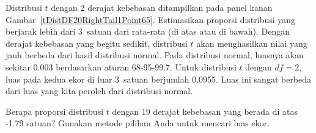 \begin{examplewrap}
\begin{nexample}{Distribusi $t$ dengan 2 derajat kebebasan
    ditampilkan pada panel kanan
    Gambar~\ref{tDistDF20RightTail1Point65}.
    Estimasikan proporsi distribusi yang berjarak lebih
    dari 3~satuan dari rata-rata (di atas atau di bawah).}
  Dengan derajat kebebasan yang begitu sedikit, distribusi $t$
  akan menghasilkan nilai yang jauh berbeda dari hasil distribusi
  normal.
  Pada distribusi normal, luasnya akan sekitar
  0.003 berdasarkan aturan 68-95-99.7.
  Untuk distribusi $t$ dengan $df = 2$, luas pada kedua
  ekor di luar 3~satuan berjumlah 0.0955.
  Luas ini sangat berbeda dari luas yang
  kita peroleh dari distribusi normal.
\end{nexample}
\end{examplewrap}

\begin{exercisewrap}
\begin{nexercise}
Berapa proporsi distribusi $t$ dengan 19 derajat
kebebasan yang berada di atas -1.79 satuan?
Gunakan metode pilihan Anda untuk mencari luas ekor.\footnotemark{}
\end{nexercise}
\end{exercisewrap}



%
%
%


